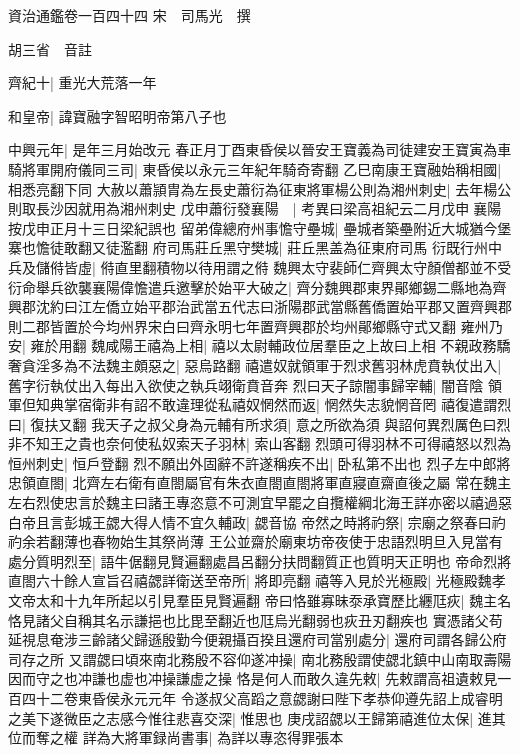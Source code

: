 資治通鑑卷一百四十四
宋　司馬光　撰

胡三省　音註

齊紀十|{
	重光大荒落一年}


和皇帝|{
	諱寶融字智昭明帝第八子也}


中興元年|{
	是年三月始改元}
春正月丁酉東昏侯以晉安王寶義為司徒建安王寶寅為車騎將軍開府儀同三司|{
	東昏侯以永元三年紀年騎奇寄翻}
乙巳南康王寶融始稱相國|{
	相悉亮翻下同}
大赦以蕭頴胄為左長史蕭衍為征東將軍楊公則為湘州刺史|{
	去年楊公則取長沙因就用為湘州刺史}
戊申蕭衍發襄陽　|{
	考異曰梁高祖紀云二月戊申襄陽按戊申正月十三日梁紀誤也}
留弟偉總府州事憺守壘城|{
	壘城者築壘附近大城猶今堡寨也憺徒敢翻又徒濫翻}
府司馬莊丘黑守樊城|{
	莊丘黑盖為征東府司馬}
衍既行州中兵及儲偫皆虛|{
	偫直里翻積物以待用謂之偫}
魏興太守裴師仁齊興太守顏僧都並不受衍命舉兵欲襲襄陽偉憺遣兵邀擊於始平大破之|{
	齊分魏興郡東界鄖鄉錫二縣地為齊興郡沈約曰江左僑立始平郡治武當五代志曰浙陽郡武當縣舊僑置始平郡又置齊興郡則二郡皆置於今均州界宋白曰齊永明七年置齊興郡於均州鄖鄉縣守式又翻}
雍州乃安|{
	雍於用翻}
魏咸陽王禧為上相|{
	禧以太尉輔政位居羣臣之上故曰上相}
不親政務驕奢貪淫多為不法魏主頗惡之|{
	惡烏路翻}
禧遣奴就領軍于烈求舊羽林虎賁執仗出入|{
	舊字衍執仗出入每出入欲使之執兵翊衛賁音奔}
烈曰天子諒闇事歸宰輔|{
	闇音陰}
領軍但知典掌宿衛非有詔不敢違理從私禧奴惘然而返|{
	惘然失志貌惘音罔}
禧復遣謂烈曰|{
	復扶又翻}
我天子之叔父身為元輔有所求須|{
	意之所欲為須}
與詔何異烈厲色曰烈非不知王之貴也奈何使私奴索天子羽林|{
	索山客翻}
烈頭可得羽林不可得禧怒以烈為恒州刺史|{
	恒戶登翻}
烈不願出外固辭不許遂稱疾不出|{
	卧私第不出也}
烈子左中郎將忠領直閤|{
	北齊左右衛有直閤屬官有朱衣直閤直閤將軍直寢直齋直後之屬}
常在魏主左右烈使忠言於魏主曰諸王專恣意不可測宜早罷之自攬權綱北海王詳亦密以禧過惡白帝且言彭城王勰大得人情不宜久輔政|{
	勰音協}
帝然之時將礿祭|{
	宗廟之祭春曰礿礿余若翻薄也春物始生其祭尚薄}
王公並齋於廟東坊帝夜使于忠語烈明旦入見當有處分質明烈至|{
	語牛倨翻見賢遍翻處昌呂翻分扶問翻質正也質明天正明也}
帝命烈將直閤六十餘人宣旨召禧勰詳衛送至帝所|{
	將即亮翻}
禧等入見於光極殿|{
	光極殿魏孝文帝太和十九年所起以引見羣臣見賢遍翻}
帝曰恪雖寡昧沗承寶歷比纒尫疢|{
	魏主名恪見諸父自稱其名示謙挹也比毘至翻近也尫烏光翻弱也疢丑刃翻疾也}
實憑諸父苟延視息奄涉三齡諸父歸遜殷勤今便親攝百揆且還府司當别處分|{
	還府司謂各歸公府司存之所}
又謂勰曰頃來南北務殷不容仰遂冲操|{
	南北務殷謂使勰北鎮中山南取壽陽因而守之也冲謙也虚也冲操謙虚之操}
恪是何人而敢久違先敕|{
	先敕謂高祖遺敕見一百四十二卷東昏侯永元元年}
令遂叔父高蹈之意勰謝曰陛下孝恭仰遵先詔上成睿明之美下遂微臣之志感今惟往悲喜交深|{
	惟思也}
庚戌詔勰以王歸第禧進位太保|{
	進其位而奪之權}
詳為大將軍録尚書事|{
	為詳以專恣得罪張本}
